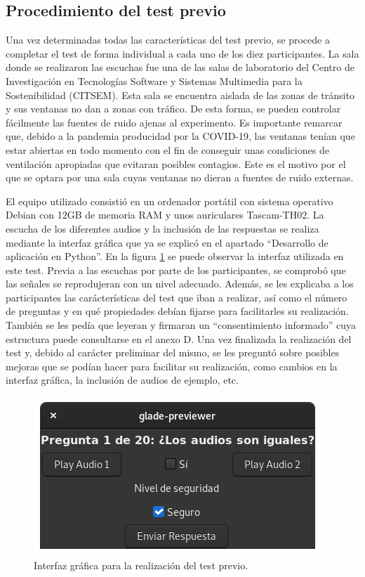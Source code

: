 \documentclass[11pt,a4paper]{book}
\begin{document}
            \subsection{Procedimiento del test previo}
                Una vez determinadas todas las características del test previo, se procede a completar el test de forma individual a cada uno de los diez participantes. La sala donde se realizaron las escuchas fue una de las salas de laboratorio del Centro de Investigación en Tecnologías Software y Sistemas Multimedia para la Sostenibilidad (CITSEM). Esta sala se encuentra aislada de las zonas de tránsito y sus ventanas no dan a zonas con tráfico. De esta forma, se pueden controlar fácilmente las fuentes de ruido ajenas al experimento. Es importante remarcar que, debido a la pandemia producidad por la COVID-19, las ventanas tenían que estar abiertas en todo momento con el fin de conseguir unas condiciones de ventilación apropiadas que evitaran posibles contagios. Este es el motivo por el que se optara por una sala cuyas ventanas no dieran a fuentes de ruido externas.
                
                El equipo utilizado consistió en un ordenador portátil con sistema operativo Debian con 12GB de memoria RAM y unos auriculares Tascam-TH02. La escucha de los diferentes audios y la inclusión de las respuestas se realiza mediante la interfaz gráfica que ya se explicó en el apartado ``Desarrollo de aplicación en Python''. En la figura \ref{fig:interfazInicial} se puede observar la interfaz utilizada en este test. Previa a las escuchas por parte de los participantes, se comprobó que las señales se reprodujeran con un nivel adecuado. Además, se les explicaba a los participantes las carácterísticas del test que iban a realizar, así como el número de preguntas y en qué propiedades debían fijarse para facilitarles su realización. También se les pedía que leyeran y firmaran un ``consentimiento informado'' cuya estructura puede consultarse en el anexo D. Una vez finalizada la realización del test y, debido al carácter preliminar del mismo, se les preguntó sobre posibles mejoras que se podían hacer para facilitar su realización, como cambios en la interfaz gráfica, la inclusión de audios de ejemplo, etc.
                
                 \begin{figure}[H]
                    \includegraphics[scale=0.6]{../imagenes/uiIni.png}
			        \centering
			        \caption{Interfaz gráfica para la realización del test previo.}
			        \label{fig:interfazInicial}
                \end{figure}
                
\end{document}
